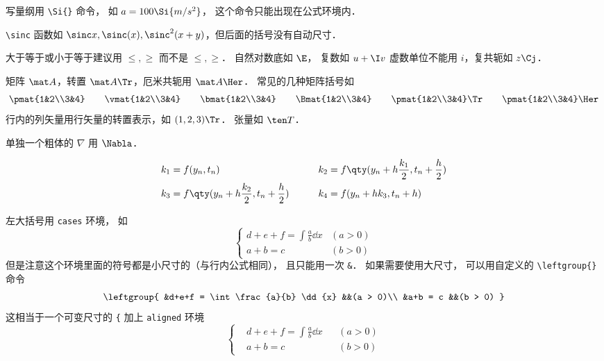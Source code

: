 写量纲用 \verb|\Si{}| 命令， 如 $a = 100\Si{m/s^2}$， 这个命令只能出现在公式环境内．

 \verb|\sinc| 函数如 $\sinc x, \sinc(x), \sinc^2(x+y)$，但后面的括号没有自动尺寸．
 
 大于等于或小于等于建议用 $\leqslant, \geqslant$ 而不是 $\le, \ge$． 自然对数底如 $\E$， 复数如 $u+\I v$ 虚数单位不能用 $i$，复共轭如 $z\Cj$．
 
 矩阵 $\mat A$，转置 $\mat A \Tr$，厄米共轭用 $\mat A \Her$． 常见的几种矩阵括号如
\begin{equation}
\pmat{1&2\\3&4} \qquad
\vmat{1&2\\3&4} \qquad 
\bmat{1&2\\3&4} \qquad
\Bmat{1&2\\3&4} \qquad
\pmat{1&2\\3&4}\Tr \qquad
\pmat{1&2\\3&4}\Her
\end{equation}
行内的列矢量用行矢量的转置表示，如 $(1,2,3)\Tr$． 张量如 $\ten T$．

单独一个粗体的 $\nabla$ 用 $\Nabla$．

\begin{equation}
\begin{aligned}
k_1 &= f(y_n, t_n) 
& k_2 &= f \qty(y_n + h\frac{k_1}{2}, t_n + \frac h2 )\\
k_3 &= f \qty( y_n + h\frac{k_2}{2}, t_n + \frac h2 ) \qquad
& k_4 &= f(y_n + hk_3, t_n + h)
\end{aligned}
\end{equation}

左大括号用 \verb|cases| 环境， 如
\begin{equation}
\begin{cases}
d+e+f = \int \frac{a}{b} \dd{x} &(a > 0)\\
a+b = c &(b > 0)
\end{cases}
\end{equation}
但是注意这个环境里面的符号都是小尺寸的（与行内公式相同）， 且只能用一次 \verb|&|． 如果需要使用大尺寸， 可以用自定义的 \verb|\leftgroup{}| 命令
\begin{equation}
\leftgroup{
&d+e+f = \int \frac{a}{b} \dd{x} &&(a > 0)\\
&a+b = c &&(b > 0)
}
\end{equation}
这相当于一个可变尺寸的 \verb|{| 加上 \verb|aligned| 环境
\begin{equation}
\left\{
\begin{aligned}
&d+e+f = \int \frac{a}{b} \dd{x} &&(a > 0)\\
&a+b = c &&(b > 0)
\end{aligned}
\right.
\end{equation}

